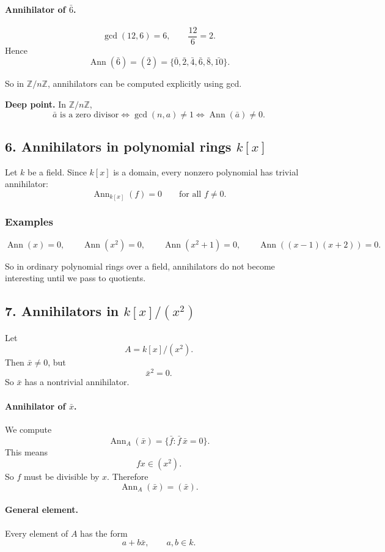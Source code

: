 \documentclass[12pt,a4paper,oneside]{report}
\DeclareMathOperator{\Ann}{Ann}
\theoremstyle{notespace}
\begin{document}
	\paragraph{Annihilator of \(\bar 6\).}
	\[
	\gcd(12,6)=6,\qquad \frac{12}{6}=2.
	\]
	Hence
	\[
	\Ann(\bar 6)=(\bar 2)=\{\bar 0,\bar 2,\bar 4,\bar 6,\bar 8,\bar{10}\}.
	\]
	
	So in \(\mathbb Z/n\mathbb Z\), annihilators can be computed explicitly using gcd.
	
	\medskip
	
	\noindent
	\textbf{Deep point.}
	In \(\mathbb Z/n\mathbb Z\),
	\[
	\bar a \text{ is a zero divisor}
	\iff
	\gcd(n,a)\neq 1
	\iff
	\Ann(\bar a)\neq 0.
	\]
	
	\subsection{6. Annihilators in polynomial rings \(k[x]\)}
	
	Let \(k\) be a field. Since \(k[x]\) is a domain, every nonzero polynomial has trivial annihilator:
	\[
	\Ann_{k[x]}(f)=0
	\qquad\text{for all }f\neq 0.
	\]
	
	\subsubsection{Examples}
	\[
	\Ann(x)=0,\qquad \Ann(x^2)=0,\qquad \Ann(x^2+1)=0,\qquad \Ann((x-1)(x+2))=0.
	\]
	
	So in ordinary polynomial rings over a field, annihilators do not become interesting until we pass to quotients.
	
	\subsection{7. Annihilators in \(k[x]/(x^2)\)}
	
	Let
	\[
	A=k[x]/(x^2).
	\]
	Then \(\bar x\neq 0\), but
	\[
	\bar x^2=0.
	\]
	So \(\bar x\) has a nontrivial annihilator.
	
	\paragraph{Annihilator of \(\bar x\).}
	We compute
	\[
	\Ann_A(\bar x)=\{\bar f:\bar f\,\bar x=0\}.
	\]
	This means
	\[
	fx\in (x^2).
	\]
	So \(f\) must be divisible by \(x\). Therefore
	\[
	\Ann_A(\bar x)=(\bar x).
	\]
	
	\paragraph{General element.}
	Every element of \(A\) has the form
	\[
	a+b\bar x,\qquad a,b\in k.
	\]
	
\end{document}
